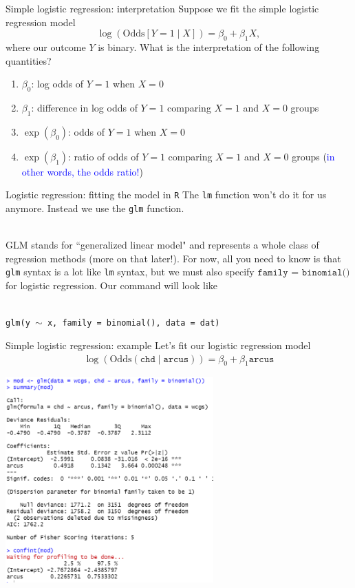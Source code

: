 \documentclass[10pt,t]{beamer}
\begin{document}
\begin{frame}{Simple logistic regression: interpretation}
	Suppose we fit the simple logistic regression model $$\log\left(\text{Odds}[Y =1 \mid X]\right) = \beta_0 + \beta_1 X,$$ where our outcome $Y$ is binary. What is the interpretation of the following quantities?
	\begin{enumerate}
		\item $\beta_0$: log odds of $Y = 1$ when $X = 0$ \pause
		\item $\beta_1$: difference in log odds of $Y = 1$ comparing $X = 1$ and $X =0$ groups \pause
		\item $\exp(\beta_0)$: odds of $Y = 1$ when $X = 0$ \pause
		\item $\exp(\beta_1)$: ratio of odds of $Y = 1$ comparing $X = 1$ and $X = 0$ groups (\textcolor{blue}{in other words, the odds ratio!})
	\end{enumerate} 
\end{frame}

\begin{frame}{Logistic regression: fitting the model in \texttt{R}}
	The \texttt{lm} function won't do it for us anymore. Instead we use the \texttt{glm} function. 
	\\ ~\ 
	
	GLM stands for ``generalized linear model" and represents a whole class of regression methods (more on that later!). For now, all you need to know is that \texttt{glm} syntax is a lot like \texttt{lm} syntax, but we must also specify $\texttt{family = binomial()}$ for logistic regression. Our command will look like
	\\ ~\
	
	\texttt{glm(y $\sim$ x, family = binomial(), data = dat)}
\end{frame}

\begin{frame}{Simple logistic regression: example}
	\vspace{-0.5cm}
	Let's fit our logistic regression model 
	\begin{align*}
		\log(\text{Odds}(\texttt{chd} \mid \texttt{arcus})) = \beta_0 + \beta_1 \texttt{arcus}
	\end{align*}
		\begin{center}
	\includegraphics[width=0.6\textwidth]{./figs/simple_logistic_regression_arcus}
\end{center}
\end{frame}
\end{document}
